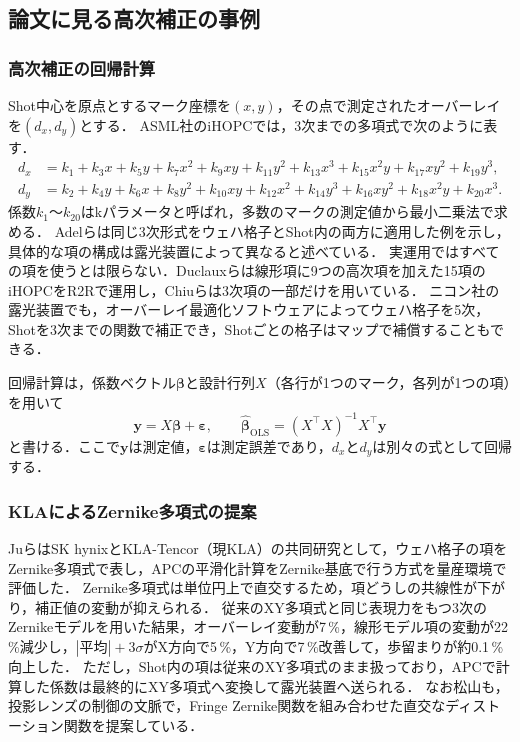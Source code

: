 \documentclass[11pt,a4paper]{ltjsarticle}
\begin{document}
\subsection{論文に見る高次補正の事例}

\subsubsection{高次補正の回帰計算}

Shot中心を原点とするマーク座標を$(x,y)$，その点で測定されたオーバーレイを$(d_x,d_y)$とする．
ASML社のiHOPCでは，3次までの多項式で次のように表す\cite{Huang2009,Duclaux2020}．
\begin{align}
  d_x &= k_1 + k_3x + k_5y + k_7x^2 + k_9xy + k_{11}y^2 + k_{13}x^3 + k_{15}x^2y + k_{17}xy^2 + k_{19}y^3, \label{eq:asml_x}\\
  d_y &= k_2 + k_4y + k_6x + k_8y^2 + k_{10}xy + k_{12}x^2 + k_{14}y^3 + k_{16}xy^2 + k_{18}x^2y + k_{20}x^3. \label{eq:asml_y}
\end{align}
係数$k_1$〜$k_{20}$はkパラメータと呼ばれ，多数のマークの測定値から最小二乗法で求める．
Adelらは同じ3次形式をウェハ格子とShot内の両方に適用した例を示し，具体的な項の構成は露光装置によって異なると述べている\cite{Adel2007}．
実運用ではすべての項を使うとは限らない．Duclauxらは線形項に9つの高次項を加えた15項のiHOPCをR2Rで運用し\cite{Duclaux2020}，Chiuらは3次項の一部だけを用いている\cite{Chiu2012}．
ニコン社の露光装置でも，オーバーレイ最適化ソフトウェアによってウェハ格子を5次，Shotを3次までの関数で補正でき，Shotごとの格子はマップで補償することもできる\cite{Matsuyama2015}．

回帰計算は，係数ベクトル$\bm\beta$と設計行列$X$（各行が1つのマーク，各列が1つの項）を用いて
\begin{equation}
  \bm y = X\bm\beta + \bm\varepsilon,\qquad
  \hat{\bm\beta}_{\mathrm{OLS}} = (X^\top X)^{-1}X^\top\bm y
  \label{eq:ols}
\end{equation}
と書ける．ここで$\bm y$は測定値，$\bm\varepsilon$は測定誤差であり，$d_x$と$d_y$は別々の式として回帰する．

\subsubsection{KLAによるZernike多項式の提案}

JuらはSK hynixとKLA-Tencor（現KLA）の共同研究として，ウェハ格子の項をZernike多項式で表し，APCの平滑化計算をZernike基底で行う方式を量産環境で評価した\cite{Ju2016}．
Zernike多項式は単位円上で直交するため，項どうしの共線性が下がり，補正値の変動が抑えられる．
従来のXY多項式と同じ表現力をもつ3次のZernikeモデルを用いた結果，オーバーレイ変動が7\,\%，線形モデル項の変動が22\,\%減少し，$|\text{平均}|+3\sigma$がX方向で5\,\%，Y方向で7\,\%改善して，歩留まりが約0.1\,\%向上した．
ただし，Shot内の項は従来のXY多項式のまま扱っており，APCで計算した係数は最終的にXY多項式へ変換して露光装置へ送られる．
なお松山も，投影レンズの制御の文脈で，Fringe Zernike関数を組み合わせた直交なディストーション関数を提案している\cite{Matsuyama2015}．
\end{document}
